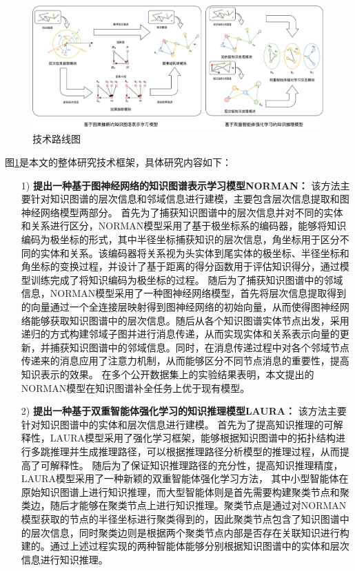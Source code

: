 \documentclass[algorithmlist, AutoFakeBold, AutoFakeSlant, figurelist, tablelist, nomlist, engineering]{seuthesix}
\begin{document}
\begin{figure}[t]
  \centering
  \includegraphics[width=1.0\textwidth]{1_Total}
  \caption{技术路线图}
  \label{1_Total}
\end{figure}
图\ref{1_Total}是本文的整体研究技术框架，具体研究内容如下：
\begin{itemize}
  \item [1)]\textbf{提出一种基于图神经网络的知识图谱表示学习模型NORMAN：}
  该方法主要针对知识图谱的层次信息和邻域信息进行建模，主要包含层次信息提取和图神经网络模型两部分。
  首先为了捕获知识图谱中的层次信息并对不同的实体和关系进行区分，NORMAN模型采用了基于极坐标系的编码器，能够将知识编码为极坐标的形式，其中半径坐标捕获知识的层次信息，角坐标用于区分不同的实体和关系。该编码器将关系视为头实体到尾实体的极坐标、半径坐标和角坐标的变换过程，并设计了基于距离的得分函数用于评估知识得分，通过模型训练完成了将知识编码为极坐标的过程。
  随后为了捕获知识图谱中的邻域信息，NORMAN模型采用了一种图神经网络模型，首先将层次信息提取得到的向量通过一个全连接层映射得到图神经网络的初始向量，从而使得图神经网络能够获取知识图谱中的层次信息。随后从各个知识图谱实体节点出发，采用递归的方式构建邻域子图并进行消息传递，从而实现实体和关系表示向量的更新，并捕获知识图谱中的邻域信息。同时，在消息传递过程中对各个邻域节点传递来的消息应用了注意力机制，从而能够区分不同节点消息的重要性，提高知识表示的效果。
  在多个公开数据集上的实验结果表明，本文提出的NORMAN模型在知识图谱补全任务上优于现有模型。
  \item [2)]\textbf{提出一种基于双重智能体强化学习的知识推理模型LAURA：}
  该方法主要针对知识图谱中的实体和层次信息进行建模。
  首先为了提高知识推理的可解释性，LAURA模型采用了强化学习框架，能够根据知识图谱中的拓扑结构进行多跳推理并生成推理路径，可以根据推理路径分析模型的推理过程，从而提高了可解释性。
  随后为了保证知识推理路径的充分性，提高知识推理精度，LAURA模型采用了一种新颖的双重智能体强化学习方法，
  其中小型智能体在原始知识图谱上进行知识推理，而大型智能体则是首先需要构建聚类节点和聚类边，随后才能够在聚类节点上进行知识推理。聚类节点是通过对NORMAN模型获取的节点的半径坐标进行聚类得到的，因此聚类节点包含了知识图谱中的层次信息，同时聚类边则是根据两个聚类节点内部是否存在关联知识进行构建的。通过上述过程实现的两种智能体能够分别根据知识图谱中的实体和层次信息进行知识推理。

\end{itemize}
\end{document}
